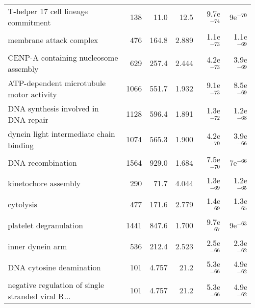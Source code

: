 \begin{longtable}{lrrrrr}
               T-helper 17 cell lineage commitment &                     138 &                    11.0 &       12.5 &         9.7e$^{-74}$ &           9e$^{-70}$ \\
                           membrane attack complex &                     476 &                   164.8 &      2.889 &         1.1e$^{-73}$ &         1.1e$^{-69}$ \\
             CENP-A containing nucleosome assembly &                     629 &                   257.4 &      2.444 &         4.2e$^{-73}$ &         3.9e$^{-69}$ \\
          ATP-dependent microtubule motor activity &                    1066 &                   551.7 &      1.932 &         9.1e$^{-73}$ &         8.5e$^{-69}$ \\
              DNA synthesis involved in DNA repair &                    1128 &                   596.4 &      1.891 &         1.3e$^{-72}$ &         1.2e$^{-68}$ \\
           dynein light intermediate chain binding &                    1074 &                   565.3 &      1.900 &         4.2e$^{-70}$ &         3.9e$^{-66}$ \\
                                 DNA recombination &                    1564 &                   929.0 &      1.684 &         7.5e$^{-70}$ &           7e$^{-66}$ \\
                              kinetochore assembly &                     290 &                    71.7 &      4.044 &         1.3e$^{-69}$ &         1.2e$^{-65}$ \\
                                         cytolysis &                     477 &                   171.6 &      2.779 &         1.4e$^{-69}$ &         1.3e$^{-65}$ \\
                            platelet degranulation &                    1441 &                   847.6 &      1.700 &         9.7e$^{-67}$ &           9e$^{-63}$ \\
                                  inner dynein arm &                     536 &                   212.4 &      2.523 &         2.5e$^{-66}$ &         2.3e$^{-62}$ \\
                          DNA cytosine deamination &                     101 &                   4.757 &       21.2 &         5.3e$^{-66}$ &         4.9e$^{-62}$ \\
 negative regulation of single stranded viral R... &                     101 &                   4.757 &       21.2 &         5.3e$^{-66}$ &         4.9e$^{-62}$ \\

\end{longtable}
